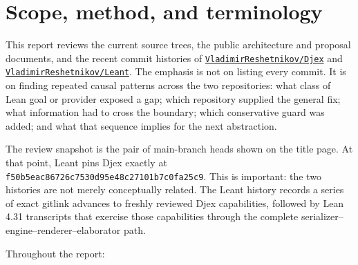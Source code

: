 \documentclass[11pt]{article}
\newcommand{\code}[1]{\texttt{#1}}
\newcommand{\Djex}{\textsf{Djex}}
\newcommand{\Leant}{\textsf{Leant}}
\newcommand{\Djinn}{Djinn}
\newcommand{\Exference}{Exference}
\newcommand{\RepoDjex}{\href{https://github.com/VladimirReshetnikov/Djex}{\code{VladimirReshetnikov/Djex}}}
\newcommand{\RepoLeant}{\href{https://github.com/VladimirReshetnikov/Leant}{\code{VladimirReshetnikov/Leant}}}
\newcommand{\headsha}[1]{\code{#1}}
\begin{document}
\begin{abstract}
On that foundation, the most promising functional extensions are: an adaptive
rather than fixed-degree rank-N plan search; a shared hash-consed subgoal and
candidate DAG; generic correlated-substitution certificates; a frontend-declared
algebra of structural families; first-class evidence and equality obligations;
recursor-skeleton synthesis for recursive data; a staged dependent-index
fragment; semantic provider retrieval at Mathlib scale; and genuinely
cooperative scheduling between \Djinn{} and \Exference{}.  The report gives
concrete data types, algorithms, invariants, migration steps, tests, and a
priority-ordered roadmap designed to preserve the projects' current fail-closed
and independently verified posture.
\end{abstract}

\tableofcontents
\clearpage
{}

\section{Scope, method, and terminology}

This report reviews the current source trees, the public architecture and
proposal documents, and the recent commit histories of \RepoDjex{} and
\RepoLeant{}.  The emphasis is not on listing every commit.  It is on finding
repeated causal patterns across the two repositories: what class of Lean goal
or provider exposed a gap; which repository supplied the general fix; what
information had to cross the boundary; which conservative guard was added; and
what that sequence implies for the next abstraction.

The review snapshot is the pair of main-branch heads shown on the title page.
At that point, \Leant{} pins \Djex{} exactly at
\headsha{f50b5eac86726c7530d95e48c27101b7c0fa25c9}.  This is important: the two
histories are not merely conceptually related.  The \Leant{} history records a
series of exact gitlink advances to freshly reviewed \Djex{} capabilities,
followed by Lean 4.31 transcripts that exercise those capabilities through the
complete serializer--engine--renderer--elaborator path.

Throughout the report:
\end{document}
